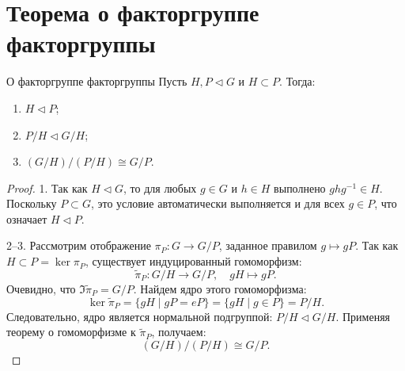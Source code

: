 
\section{Теорема о факторгруппе факторгруппы}

\begin{Theorem}{О факторгруппе факторгруппы}{}
	Пусть $H, P \triangleleft G$ и $H \subset P$. Тогда:
	\begin{enumerate}
		\item $H \triangleleft P$;
		\item $P/H \triangleleft G/H$;
		\item $(G/H)/(P/H) \cong G/P$.
	\end{enumerate}
\end{Theorem}

\begin{proof}
	1. Так как $H \triangleleft G$, то для любых $g \in G$ и $h \in H$ выполнено $ghg^{-1} \in H$. Поскольку $P \subset G$, это условие автоматически выполняется и для всех $g \in P$, что означает $H \triangleleft P$.

	2--3. Рассмотрим отображение $\pi_P \colon G \to G/P$, заданное правилом $g \mapsto gP$. Так как $H \subset P = \ker \pi_P$, существует индуцированный гомоморфизм:
	\[
	\widetilde{\pi}_P \colon G/H \to G/P, \quad gH \mapsto gP.
	\]
	Очевидно, что $\Im \widetilde{\pi}_P = G/P$. Найдем ядро этого гомоморфизма:
	\[
	\ker \widetilde{\pi}_P = \{ gH \mid gP = eP \} = \{ gH \mid g \in P \} = P/H.
	\]
	Следовательно, ядро является нормальной подгруппой: $P/H \triangleleft G/H$.
	Применяя теорему о гомоморфизме к $\widetilde{\pi}_P$, получаем:
	\[
	(G/H)/(P/H) \cong G/P.
	\]
\end{proof}


